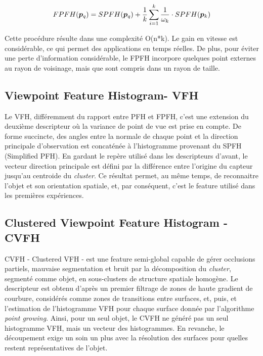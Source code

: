 $$FPFH(\boldsymbol{p}_q) = SPFH(\boldsymbol{p}_q) + {1 \over k}
\sum_{i=1}^k {{1 \over \omega_k} \cdot SPFH(\boldsymbol{p}_k)}$$

Cette procédure résulte dans une complexité O(n*k). Le gain en vitesse est considérable,
ce qui permet des applications en temps réelles. De plus, pour éviter une perte d'information considérable, le FPFH
incorpore quelques point externes au rayon de voisinage, mais que sont compris dans un rayon de taille.

\subsection{Viewpoint Feature Histogram- VFH}

Le VFH, différemment du rapport entre PFH et FPFH, c'est une extension
du deuxième descripteur où la variance de point de vue est prise en
compte. De forme succincte, des angles entre la normale de chaque point
et la direction principale d'observation est concaténée à l’histogramme
provenant du SPFH (Simplified PFH). En gardant le repère utilisé dans
les descripteurs d'avant, le vecteur direction principale est défini
par la différence entre l'origine du capteur jusqu'au centroide du
\textit{cluster}. Ce résultat permet, au même temps, de reconnaitre
l'objet et son orientation spatiale, et, par conséquent, c'est le
feature utilisé dans les premières expériences.

\subsection{Clustered Viewpoint Feature Histogram - CVFH} CVFH -
Clustered VFH - est une feature semi-global capable de gérer
occlusions partiels, mauvaise segmentation et bruit par la
décomposition du \textit{cluster}, segmenté comme objet, en sous-clusters de
structure spatiale homogène. Le descripteur est obtenu d'après un premier
filtrage de zones de haute gradient de courbure, considérés comme zones de
transitions entre surfaces, et, puis, et l'estimation de l'histogramme VFH pour chaque surface 
donnée par l'algorithme \textit{point growing}. Ainsi, pour un seul objet, le CVFH ne
généré pas un seul histogramme VFH, mais un vecteur des histogrammes.
En revanche, le découpement exige un soin un plus avec la résolution des surfaces pour
quelles restent représentatives de l'objet.

